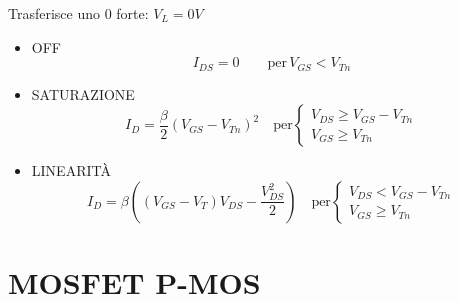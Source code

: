 \documentclass{article}
\begin{document}
\begin{minipage}{0.2\textwidth}
\end{minipage}
\begin{minipage}{0.8\textwidth}
    Trasferisce uno 0 forte: $V_L = 0V$
    \begin{itemize}
        \item OFF
            \[ I_{DS} = 0 \qquad \text{per}\, V_{GS} < V_{Tn} \]
        \item SATURAZIONE
            \[ I_D  = \frac{\beta}{2} {(V_{GS} - V_{Tn})}^2 \quad\text{per}
            \begin{cases}
                V_{DS} \ge V_{GS} - V_{Tn}\\
                V_{GS} \ge V_{Tn}
            \end{cases}
        \]
        \item LINEARITÀ
            \[
                I_D = \beta\left((V_{GS} - V_T)V_{DS} - \frac{V_{DS}^2}{2}\right)
                \quad\text{per}
                \begin{cases}
                    V_{DS} < V_{GS} - V_{Tn}\\
                    V_{GS} \ge V_{Tn}
                \end{cases}
            \]
    \end{itemize}
\end{minipage}

\bigbreak%
\section*{MOSFET P-MOS}
\end{document}
